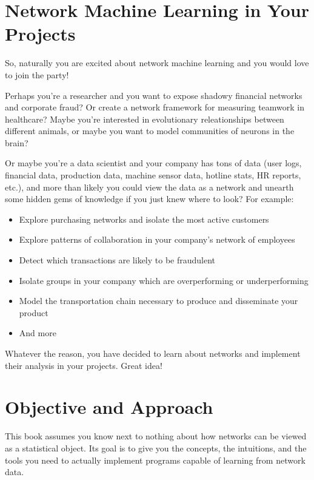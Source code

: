 \documentclass[letterpaper,10pt,english]{jupyterBook}
\begin{document}
\section{Network Machine Learning in Your Projects}
\label{\detokenize{introduction/preface:network-machine-learning-in-your-projects}}
\sphinxAtStartPar
So, naturally you are excited about network machine learning and you would love to join the party!

\sphinxAtStartPar
Perhaps you’re a researcher and you want to expose shadowy financial networks and corporate fraud? Or create a network framework for measuring teamwork in healthcare? Maybe you’re interested in evolutionary releationships between different animals, or maybe you want to model communities of neurons in the brain?

\sphinxAtStartPar
Or maybe you’re a data scientist and your company has tons of data (user logs, financial data, production data, machine sensor data, hotline stats, HR reports, etc.), and more than likely you could
view the data as a network and unearth some hidden gems of knowledge if you just knew where to look? For example:
\begin{itemize}
\item {} 
\sphinxAtStartPar
Explore purchasing networks and isolate the most active customers

\item {} 
\sphinxAtStartPar
Explore patterns of collaboration in your company’s network of employees

\item {} 
\sphinxAtStartPar
Detect which transactions are likely to be fraudulent

\item {} 
\sphinxAtStartPar
Isolate groups in your company which are overperforming or underperforming

\item {} 
\sphinxAtStartPar
Model the transportation chain necessary to produce and disseminate your product

\item {} 
\sphinxAtStartPar
And more

\end{itemize}

\sphinxAtStartPar
Whatever the reason, you have decided to learn about networks and implement their analysis in your projects. Great idea!


\section{Objective and Approach}
\label{\detokenize{introduction/preface:objective-and-approach}}
\sphinxAtStartPar
This book assumes you know next to nothing about how networks can be viewed as a statistical object. Its goal is to give you the concepts, the intuitions, and the tools you need to actually implement programs capable of learning from network data.
\end{document}
